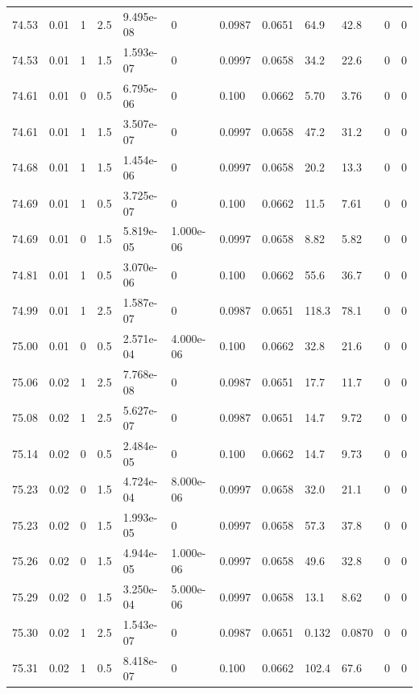 \documentclass[preview]{standalone}
\begin{document}
{{{{{{{{{{{{{{{{{\begin{tabular}{L{1.2cm}C{1.2cm} C{0.3cm}C{0.5cm} C{1.4cm}C{1.4cm} C{1.4cm}C{1.4cm} C{1.6cm}C{1.6cm} C{1.6cm}C{1.6cm}}
  74.53  &  0.01  & 1     & 2.5 &  9.495e-08  & 0  &  0.0987&   0.0651& 64.9 & 42.8   &  0 & 0  \\ 
  74.53  &  0.01  & 1     & 1.5 &  1.593e-07  & 0  &  0.0997&   0.0658& 34.2 & 22.6   &  0 & 0  \\ 
  74.61  &  0.01  & 0     & 0.5 &  6.795e-06  & 0  &  0.100&   0.0662& 5.70 & 3.76   &  0 & 0  \\ 
  74.61  &  0.01  & 1     & 1.5 &  3.507e-07  & 0  &  0.0997&   0.0658& 47.2 & 31.2   &  0 & 0  \\ 
  74.68  &  0.01  & 1     & 1.5 &  1.454e-06  & 0  &  0.0997&   0.0658& 20.2 & 13.3   &  0 & 0  \\ 
  74.69  &  0.01  & 1     & 0.5 &  3.725e-07  & 0  &  0.100&   0.0662& 11.5 & 7.61   &  0 & 0  \\ 
  74.69  &  0.01  & 0     & 1.5 &  5.819e-05  & 1.000e-06  &  0.0997&   0.0658& 8.82 & 5.82   &  0 & 0  \\ 
  74.81  &  0.01  & 1     & 0.5 &  3.070e-06  & 0  &  0.100&   0.0662& 55.6 & 36.7   &  0 & 0  \\ 
  74.99  &  0.01  & 1     & 2.5 &  1.587e-07  & 0  &  0.0987&   0.0651& 118.3 & 78.1   &  0 & 0  \\ 
  75.00  &  0.01  & 0     & 0.5 &  2.571e-04  & 4.000e-06  &  0.100&   0.0662& 32.8 & 21.6   &  0 & 0  \\ 
  75.06  &  0.02  & 1     & 2.5 &  7.768e-08  & 0  &  0.0987&   0.0651& 17.7 & 11.7   &  0 & 0  \\ 
  75.08  &  0.02  & 1     & 2.5 &  5.627e-07  & 0  &  0.0987&   0.0651& 14.7 & 9.72   &  0 & 0  \\ 
  75.14  &  0.02  & 0     & 0.5 &  2.484e-05  & 0  &  0.100&   0.0662& 14.7 & 9.73   &  0 & 0  \\ 
  75.23  &  0.02  & 0     & 1.5 &  4.724e-04  & 8.000e-06  &  0.0997&   0.0658& 32.0 & 21.1   &  0 & 0  \\ 
  75.23  &  0.02  & 0     & 1.5 &  1.993e-05  & 0  &  0.0997&   0.0658& 57.3 & 37.8   &  0 & 0  \\ 
  75.26  &  0.02  & 0     & 1.5 &  4.944e-05  & 1.000e-06  &  0.0997&   0.0658& 49.6 & 32.8   &  0 & 0  \\ 
  75.29  &  0.02  & 0     & 1.5 &  3.250e-04  & 5.000e-06  &  0.0997&   0.0658& 13.1 & 8.62   &  0 & 0  \\ 
  75.30  &  0.02  & 1     & 2.5 &  1.543e-07  & 0  &  0.0987&   0.0651& 0.132 & 0.0870   &  0 & 0  \\ 
  75.31  &  0.02  & 1     & 0.5 &  8.418e-07  & 0  &  0.100&   0.0662& 102.4 & 67.6   &  0 & 0  \\ 

\end{tabular}}}}}}}}}}}}}}}}}}
\end{document}
